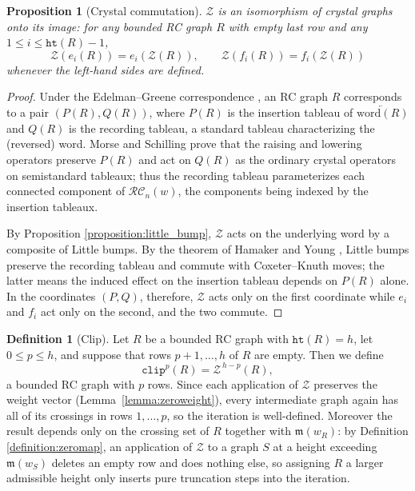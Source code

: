 \documentclass{amsart}
\newtheorem{proposition}[lemma]{Proposition}
\theoremstyle{definition}
\newtheorem{definition}[lemma]{Definition}
\theoremstyle{remark}
\numberwithin{equation}{subsection}
\newcommand{\wof}[1]{w_{#1}}
\newcommand{\zeromap}{\mathcal{Z}}
\newcommand{\hr}{\mathtt{ht}}
\newcommand{\clp}{\mathtt{clip}}
\newcommand{\RC}{\mathcal{RC}}
\newcommand{\maxd}{\mathfrak{m}}
\begin{document}
\begin{proposition}[Crystal commutation]\label{proposition:zerocrystal}
$\zeromap$ is an isomorphism of crystal graphs onto its image: for any bounded RC graph $R$ with empty last row and any $1\leq i\leq \hr(R)-1$,
$$\zeromap(e_i(R)) = e_i(\zeromap(R)),\qquad \zeromap(f_i(R)) = f_i(\zeromap(R))$$
whenever the left-hand sides are defined.
\end{proposition}
\begin{proof}
Under the Edelman--Greene correspondence \cite{edelman1987balanced}, an RC graph $R$ corresponds to a pair $(P(R),Q(R))$, where $P(R)$ is the insertion tableau of $\overleftarrow{\mathrm{word}(R)}$ and $Q(R)$ is the recording tableau, a standard tableau characterizing the (reversed) word. Morse and Schilling \cite{morse2016crystal} prove that the raising and lowering operators preserve $P(R)$ and act on $Q(R)$ as the ordinary crystal operators on semistandard tableaux; thus the recording tableau parameterizes each connected component of $\RC_n(w)$, the components being indexed by the insertion tableaux.

By Proposition \ref{proposition:little_bump}, $\zeromap$ acts on the underlying word by a composite of Little bumps. By the theorem of Hamaker and Young \cite[Theorem~4.4]{hamaker2014relating}, Little bumps preserve the recording tableau and commute with Coxeter--Knuth moves; the latter means the induced effect on the insertion tableau depends on $P(R)$ alone. In the coordinates $(P,Q)$, therefore, $\zeromap$ acts only on the first coordinate while $e_i$ and $f_i$ act only on the second, and the two commute.
\end{proof}

\begin{definition}[Clip]\label{definition:clptrm}
Let $R$ be a bounded RC graph with $\hr(R)=h$, let $0\leq p\leq h$, and suppose that rows $p+1,\ldots,h$ of $R$ are empty. Then we define
$$\clp^p(R)=\zeromap^{\,h-p}(R),$$
a bounded RC graph with $p$ rows. Since each application of $\zeromap$ preserves the weight vector (Lemma~\ref{lemma:zeroweight}), every intermediate graph again has all of its crossings in rows $1,\ldots,p$, so the iteration is well-defined. Moreover the result depends only on the crossing set of $R$ together with $\maxd(\wof{R})$: by Definition \ref{definition:zeromap}, an application of $\zeromap$ to a graph $S$ at a height exceeding $\maxd(\wof{S})$ deletes an empty row and does nothing else, so assigning $R$ a larger admissible height only inserts pure truncation steps into the iteration.
\end{definition}
\end{document}
